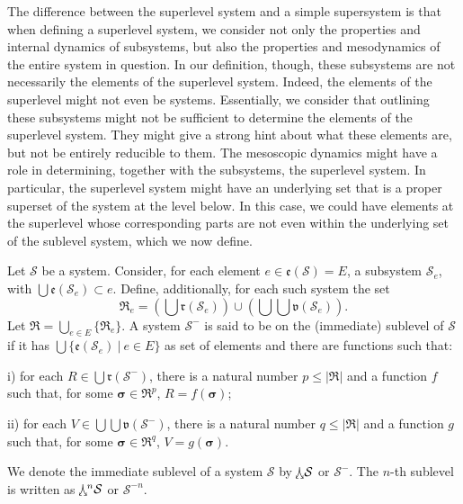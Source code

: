 The difference between the superlevel system and a simple supersystem is that when defining a superlevel system, we consider not only the properties and internal dynamics of subsystems, but also the properties and mesodynamics of the entire system in question. In our definition, though, these subsystems are not necessarily the elements of the superlevel system. Indeed, the elements of the superlevel might not even be systems. Essentially, we consider that outlining these subsystems might not be sufficient to determine the elements of the superlevel system. They might give a strong hint about what these elements are, but not be entirely reducible to them. The mesoscopic dynamics might have a role in determining, together with the subsystems, the superlevel system. In particular, the superlevel system might have an underlying set that is a proper superset of the system at the level below. In this case, we could have elements at the superlevel whose corresponding parts are not even within the underlying set of the sublevel system, which we now define.

\begin{definition} \label{def::slevel}
	Let $\mathcal{S}$ be a system. Consider, for each element $e \in \mathfrak{e}(\mathcal{S}) = E$, a subsystem $\mathcal{S}_e$, with $\bigcup \mathfrak{e}(\mathcal{S}_e) \subset e$. Define, additionally, for each such system the set 
	\[\mathfrak{R}_e = \left(\bigcup \mathfrak{r}(\mathcal{S}_e)\right) \cup \left(\bigcup\bigcup \mathfrak{v}(\mathcal{S}_e)\right).\] 
	Let $\mathfrak{R} = \bigcup_{e \in E} \{\mathfrak{R}_e \}$.  A system $\mathcal{S}^-$ is said to be on the (immediate) sublevel of $\mathcal{S}$ if it has $\bigcup \{\mathfrak{e}(\mathcal{S}_e)\ |\ e \in E\}$ as set of elements and there are functions such that:
	
	\noindent
	i) for each $R \in \bigcup\mathfrak{r}(\mathcal{S}^-)$, there is a natural number $p \leq |\mathfrak{R}|$ and a function $f$ such that, for some $\boldsymbol{\sigma} \in \mathfrak{R}^p$, $R = f(\boldsymbol{\sigma})$;
	
	\noindent
	ii) for each $V \in \bigcup\bigcup\mathfrak{v}(\mathcal{S}^-)$, there is a natural number $q \leq |\mathfrak{R}|$ and a function $g$ such that, for some $\boldsymbol{\sigma} \in \mathfrak{R}^q$, $V = g(\boldsymbol{\sigma})$.
	
	\noindent
	We denote the immediate sublevel of a system $\mathcal{S}$ by $\slv{\mathcal{S}}$ or $\mathcal{S}^-$. The $n$-th sublevel is written as $\slv[n]{\mathcal{S}}$ or $\mathcal{S}^{-n}$.
\end{definition}	

